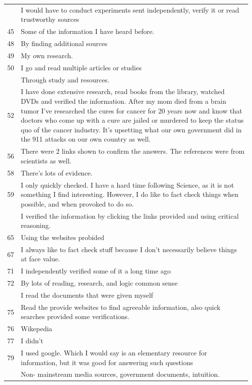 \documentclass[
  doc,floatsintext]{apa6}
\begin{document}
\begin{longtable}[t]{>{}r>{\raggedright\arraybackslash}p{30em}}
\addlinespace
44 & I would have to conduct experiments sent independently, verify it or read trustworthy sources\\
45 & Some of the information I have heard before.\\
48 & By finding additional sources\\
49 & My own research.\\
50 & I go and read multiple articles or studies\\
\addlinespace
51 & Through study and resources.\\
52 & I have done extensive research, read books from the library, watched DVDs and verified the information. After my mom died from a brain tumor I've researched the cures for cancer for 20 years now and know that doctors who come up with a cure are jailed or murdered to keep the status quo of the cancer industry. It's upsetting what our own government did in the 911 attacks on our own country as well.\\
56 & There were 2 links shown to confirm the answers.  The references were from scientists as well.\\
58 & There's lots of evidence.\\
59 & I only quickly checked. I have a hard time following Science, as it is not something I find interesting. However, I do like to fact check things when possible, and when provoked to do so.\\
\addlinespace
60 & I verified the information by clicking the links provided and using critical reasoning.\\
65 & Using the websites probided\\
67 & I always like to fact check stuff because I don't necessarily believe things at face value.\\
71 & I independently verified some of it a long time ago\\
72 & By lots of reading, research, and logic common sense\\
\addlinespace
74 & I read the documents that were given myself\\
75 & Read the provide websites to find agreeable information, also quick searches provided some verifications.\\
76 & Wikepedia\\
77 & I didn't\\
79 & I used google. Which I would say is an elementary resource for information, but it was good for answering such questions\\
\addlinespace
82 & Non- mainstream media sources, government documents, intuition.\\

\end{longtable}
\end{document}
